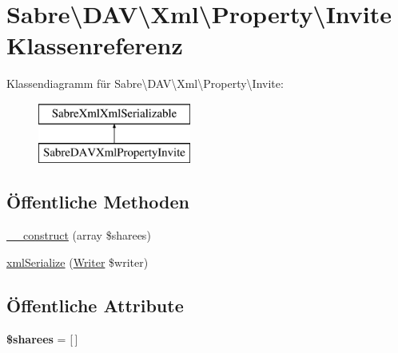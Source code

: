 \hypertarget{class_sabre_1_1_d_a_v_1_1_xml_1_1_property_1_1_invite}{}\section{Sabre\textbackslash{}D\+AV\textbackslash{}Xml\textbackslash{}Property\textbackslash{}Invite Klassenreferenz}
\label{class_sabre_1_1_d_a_v_1_1_xml_1_1_property_1_1_invite}
Klassendiagramm für Sabre\textbackslash{}D\+AV\textbackslash{}Xml\textbackslash{}Property\textbackslash{}Invite\+:\begin{figure}[H]
\begin{center}
\leavevmode
\includegraphics[height=2.000000cm]{class_sabre_1_1_d_a_v_1_1_xml_1_1_property_1_1_invite}
\end{center}
\end{figure}
\subsection*{Öffentliche Methoden}
\begin{DoxyCompactItemize}
\item 
\mbox{\hyperlink{class_sabre_1_1_d_a_v_1_1_xml_1_1_property_1_1_invite_ac1b085c8a9e42843641f5e41eeafc88f}{\+\_\+\+\_\+construct}} (array \$sharees)
\item 
\mbox{\hyperlink{class_sabre_1_1_d_a_v_1_1_xml_1_1_property_1_1_invite_a78400777f323c1a2cdc441d003cf6eb9}{xml\+Serialize}} (\mbox{\hyperlink{class_sabre_1_1_xml_1_1_writer}{Writer}} \$writer)
\end{DoxyCompactItemize}
\subsection*{Öffentliche Attribute}
\begin{DoxyCompactItemize}
\item 
\mbox{\label{class_sabre_1_1_d_a_v_1_1_xml_1_1_property_1_1_invite_a4fe81866cc9686f9e66222993797a0ee}} 
{\bfseries \$sharees} = \mbox{[}$\,$\mbox{]}
\end{DoxyCompactItemize}


